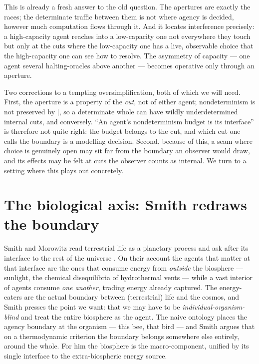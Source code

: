 \documentclass[11pt]{article}
\theoremstyle{definition}
\theoremstyle{plain}
\theoremstyle{remark}
\newcommand{\Cut}{\mid}
\begin{document}
\noindent
This is already a fresh answer to the old question. The apertures are exactly the
races; the determinate traffic between them is not where agency is decided, however
much computation flows through it. And it locates interference precisely: a
high-capacity agent reaches into a low-capacity one not everywhere they touch but
only at the cuts where the low-capacity one has a live, observable choice that the
high-capacity one can see how to resolve. The asymmetry of capacity --- one agent
several halting-oracles above another --- becomes operative only through an aperture.

Two corrections to a tempting oversimplification, both of which we will need. First,
the aperture is a property of the \emph{cut}, not of either agent; nondeterminism is
not preserved by $\Cut$, so a determinate whole can have wildly underdetermined
internal cuts, and conversely. ``An agent's nondeterminism budget is its interface''
is therefore not quite right: the budget belongs to the cut, and which cut one calls
the boundary is a modelling decision. Second, because of this, a seam where choice is
genuinely open may sit far from the boundary an observer would draw, and its effects
may be felt at cuts the observer counts as internal. We turn to a setting where this
plays out concretely.

\section{The biological axis: Smith redraws the boundary}\label{sec:smith}

Smith and Morowitz read terrestrial life as a planetary process and ask after its
interface to the rest of the universe \cite{smith}. On their account the agents that
matter at that interface are the ones that consume energy from \emph{outside} the
biosphere --- sunlight, the chemical disequilibria of hydrothermal vents --- while a
vast interior of agents consume \emph{one another}, trading energy already captured.
The energy-eaters are the actual boundary between (terrestrial) life and the cosmos,
and Smith presses the point we want: that we may have to be
\emph{individual-organism-blind} and treat the entire biosphere as the agent. The
naive ontology places the agency boundary at the organism --- this bee, that bird ---
and Smith argues that on a thermodynamic criterion the boundary belongs somewhere else
entirely, around the whole. For him the biosphere is the macro-component, unified by
its single interface to the extra-biospheric energy source.
\end{document}
